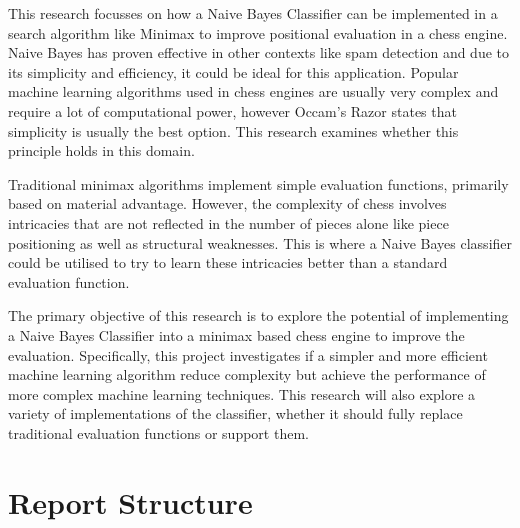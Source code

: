 \documentclass[20pt]{informatics-report}
\begin{document}
This research focusses on how a Naive Bayes Classifier can be implemented in a search algorithm like Minimax to improve positional evaluation in a chess engine. Naive Bayes has proven effective in other contexts like spam detection and due to its simplicity and efficiency, it could be ideal for this application. Popular machine learning algorithms used in chess engines are usually very complex and require a lot of computational power, however Occam's Razor states that simplicity is usually the best option. This research examines whether this principle holds in this domain. 

Traditional minimax algorithms implement simple evaluation functions, primarily based on material advantage. However, the complexity of chess involves intricacies that are not reflected in the number of pieces alone like piece positioning as well as structural weaknesses. This is where a Naive Bayes classifier could be utilised to try to learn these intricacies better than a standard evaluation function.

The primary objective of this research is to explore the potential of implementing a Naive Bayes Classifier into a minimax based chess engine to improve the evaluation. Specifically, this project investigates if a simpler and more efficient machine learning algorithm reduce complexity but achieve the performance of more complex machine learning techniques. This research will also explore a variety of implementations of the classifier, whether it should fully replace traditional evaluation functions or support them.





\section{Report Structure}



% 

% 
% 
% 








\appendix



\end{document}
